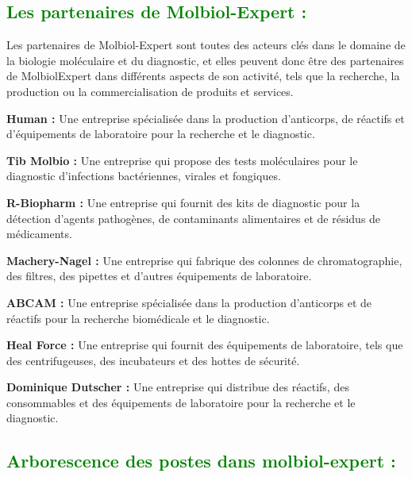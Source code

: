 \begin{flushleft}
	\subsection{\textcolor{green}{Les partenaires de Molbiol-Expert :}}
	Les partenaires de Molbiol-Expert sont toutes des acteurs clés dans le domaine de la biologie moléculaire et du diagnostic, et elles peuvent donc être des partenaires de MolbiolExpert dans différents aspects de son activité, tels que la recherche, la production ou la commercialisation de produits et services. \newline
	
	\textbf{Human :}  Une entreprise spécialisée dans la production d'anticorps, de réactifs et d'équipements de laboratoire pour la recherche et le diagnostic.\newline
	
	\textbf{Tib Molbio :}  Une entreprise qui propose des tests moléculaires pour le diagnostic d'infections bactériennes, virales et fongiques.\newline
	
	\textbf{R-Biopharm :}  Une entreprise qui fournit des kits de diagnostic pour la détection d'agents pathogènes, de contaminants alimentaires et de résidus de médicaments.\newline
	
	\textbf{Machery-Nagel :}  Une entreprise qui fabrique des colonnes de chromatographie, des filtres, des pipettes et d'autres équipements de laboratoire.\newline
	
	\textbf{ABCAM :}  Une entreprise spécialisée dans la production d'anticorps et de réactifs pour la recherche biomédicale et le diagnostic.
	
	\textbf{Heal Force :}  Une entreprise qui fournit des équipements de laboratoire, tels que des centrifugeuses, des incubateurs et des hottes de sécurité.\newline
	
	\textbf{Dominique Dutscher :}  Une entreprise qui distribue des réactifs, des consommables et des équipements de laboratoire pour la recherche et le diagnostic.\newline
	
	\subsection{\textcolor{green}{Arborescence des postes dans molbiol-expert :}}
	

\end{flushleft}
